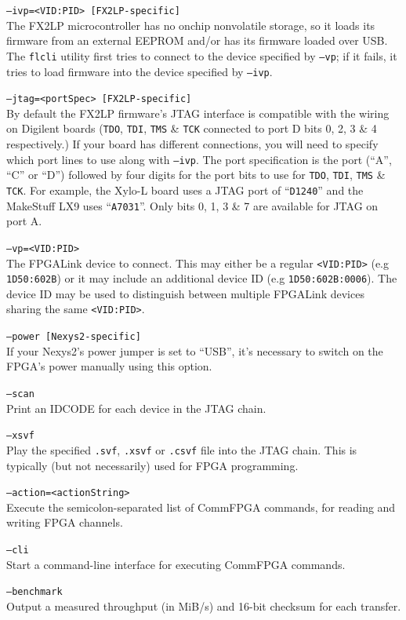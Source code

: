 \begin{desc}
  \item[\texttt{--ivp=<VID:PID> [FX2LP-specific]}] \hfill \\
    The FX2LP microcontroller has no onchip nonvolatile storage, so it loads its firmware from an external EEPROM and/or has its firmware loaded over USB. The \texttt{flcli} utility first tries to connect to the device specified by \texttt{--vp}; if it fails, it tries to load firmware into the device specified by \texttt{--ivp}.
  \item[\texttt{--jtag=<portSpec> [FX2LP-specific]}] \hfill \\
    By default the FX2LP firmware's JTAG interface is compatible with the wiring on Digilent boards (\texttt{TDO}, \texttt{TDI}, \texttt{TMS} \& \texttt{TCK} connected to port D bits 0, 2, 3 \& 4 respectively.) If your board has different connections, you will need to specify which port lines to use along with \texttt{--ivp}. The port specification is the port (``A'', ``C'' or ``D'') followed by four digits for the port bits to use for \texttt{TDO}, \texttt{TDI}, \texttt{TMS} \& \texttt{TCK}. For example, the Xylo-L board uses a JTAG port of ``\texttt{D1240}'' and the MakeStuff LX9 uses ``\texttt{A7031}''. Only bits 0, 1, 3 \& 7 are available for JTAG on port A.
  \item[\texttt{--vp=<VID:PID>}] \hfill \\
    The FPGALink device to connect. This may either be a regular \texttt{<VID:PID>} (e.g \texttt{1D50:602B}) or it may include an additional device ID (e.g \texttt{1D50:602B:0006}). The device ID may be used to distinguish between multiple FPGALink devices sharing the same \texttt{<VID:PID>}.
  \item[\texttt{--power [Nexys2-specific]}] \hfill \\
    If your Nexys2's power jumper is set to ``USB'', it's necessary to switch on the FPGA's power manually using this option.
  \item[\texttt{--scan}] \hfill \\
    Print an IDCODE for each device in the JTAG chain.
  \item[\texttt{--xsvf}] \hfill \\
    Play the specified \texttt{.svf}, \texttt{.xsvf} or \texttt{.csvf} file into the JTAG chain. This is typically (but not necessarily) used for FPGA programming.
  \item[\texttt{--action=<actionString>}] \hfill \\
    Execute the semicolon-separated list of CommFPGA commands, for reading and writing FPGA channels.
  \item[\texttt{--cli}] \hfill \\
    Start a command-line interface for executing CommFPGA commands.
  \item[\texttt{--benchmark}] \hfill \\
    Output a measured throughput (in MiB/s) and 16-bit checksum for each transfer.
\end{desc}

